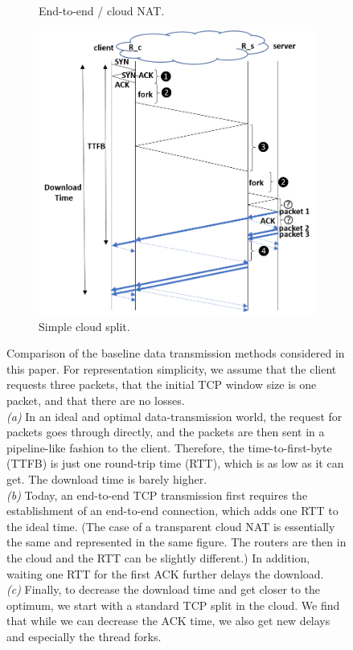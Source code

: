 \documentclass[10pt,sigconf]{acmart}
\begin{document}
\begin{figure}[t]
\begin{subfigure}{0.65\columnwidth}
    \caption{End-to-end / cloud NAT.} \label{fig:e2e}
\end{subfigure}    \centering
\begin{subfigure}{0.65\columnwidth}
  \centering
  \includegraphics[width=\columnwidth]{figures/split.png}
    \caption{Simple cloud split.} \label{fig:split}
\end{subfigure}
    \caption{Comparison of the baseline data transmission methods considered in this paper. For representation simplicity, we assume that the client requests three packets, that the initial TCP window size is one packet, and that there are no losses.\\ \textit{(a)} In an ideal and optimal data-transmission world, the request for packets goes through directly, and the packets are then sent in a pipeline-like fashion to the client. Therefore, the time-to-first-byte (TTFB) is just one round-trip time (RTT), which is as low as it can get. The download time is barely higher.\\ \textit{(b)} Today, an end-to-end TCP transmission first requires the establishment of an end-to-end connection, which adds one RTT to the ideal time. (The case of a transparent cloud NAT is essentially the same and represented in the same figure. The routers are then in the cloud and the RTT can be slightly different.) In addition, waiting one RTT for the first ACK further delays the download. \\ \textit{(c)} Finally, to decrease the download time and get closer to the optimum, we start with a standard TCP split in the cloud. We find that while  we can decrease the ACK time, we also get new delays and especially the thread forks. \\
}
\end{figure}
\end{document}
